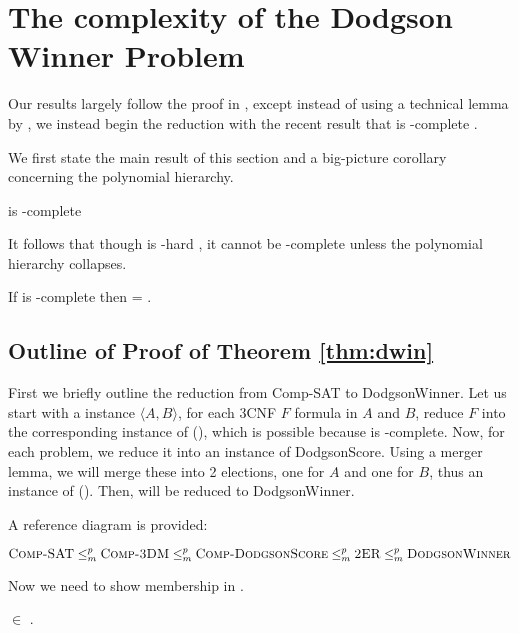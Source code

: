 \section{The complexity of the Dodgson Winner Problem}
Our results largely follow the proof in \citet{exactdodgson}, except instead of
using a technical lemma by \citet{wag90}, we instead begin the reduction
with the recent result that  is \tp-complete \citep{compsat}.

We first state the main result of this section and a big-picture corollary
concerning the polynomial hierarchy.

\begin{theorem}\label{thm:dwin}
     is \tp-complete
\end{theorem}

It follows that though  is \np-hard \citep{bartholdiVoting},
it cannot be \np-complete unless the polynomial hierarchy collapses.

\begin{corollary}
    If  is \np-complete then  = \np.
\end{corollary}

\subsection{Outline of Proof of Theorem \ref{thm:dwin}}
    First we briefly outline the reduction from Comp-SAT to
DodgsonWinner.
Let us start with a \csat instance $\langle A,B \rangle$, for each 3CNF $F$
formula in $A$ and $B$, reduce $F$ into the corresponding instance of
 (), which is possible because
 is \np-complete.
Now, for each  problem, we reduce it into an instance of DodgsonScore.
Using a merger lemma, we will merge these into 2 elections, one for $A$
and one for $B$, thus an instance of  ().
Then,  will be reduced to DodgsonWinner.

A reference diagram is provided:

\[\text{{\sc Comp-SAT}} \le_m^p \text{{\sc Comp-3DM}} \le_m^p
\text{{\sc Comp-DodgsonScore}} \le_m^p
\text{{\sc 2ER}} \le_m^p \text{{\sc DodgsonWinner}}\]

Now we need to show membership in \tp.
\begin{theorem} \label{thm:intp}
     $\in$ \tp. \\
\end{theorem}

